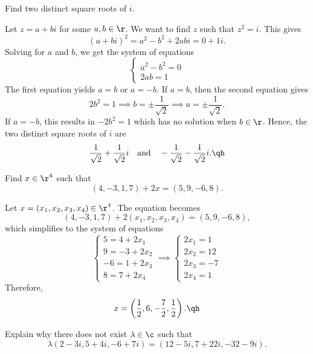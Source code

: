 \begin{exercise}[1a8]
    Find two distinct square roots of $i$.
\end{exercise}

\begin{sol}
    Let $z = a + bi$ for some $a, b \in \r$. We want to find $z$ such that $z^2 = i$. This gives
    \[(a + bi)^2 = a^2 - b^2 + 2abi = 0 + 1i.\]
    Solving for $a$ and $b$, we get the system of equations
    \[\begin{cases}
        a^2 - b^2 = 0 \\
        2ab = 1
    \end{cases}\]
    The first equation yields $a = b$ or $a = -b$. If $a = b$, then the second equation gives
    \[2b^2 = 1 \implies b = \pm\frac{1}{\sqrt{2}} \implies a = \pm\frac{1}{\sqrt{2}}.\]
    If $a = -b$, this results in $-2b^2 = 1$ which has no solution when $b \in \r$. Hence, the two distinct square roots of $i$ are
    \[\frac{1}{\sqrt{2}} + \frac{1}{\sqrt{2}}i \quad \text{and} \quad -\frac{1}{\sqrt{2}} - \frac{1}{\sqrt{2}}i. \qh\]
\end{sol}

\begin{exercise}[1a9]
    Find $x \in \r^4$ such that
    \[(4, -3, 1, 7) + 2x = (5, 9, -6, 8).\]
\end{exercise}

\begin{sol}
    Let $x = (x_1, x_2, x_3, x_4) \in \r^4$. The equation becomes
    \[(4, -3, 1, 7) + 2(x_1, x_2, x_3, x_4) = (5, 9, -6, 8),\]
    which simplifies to the system of equations
    \[\begin{cases}
        5 = 4 + 2x_1 \\
        9 = -3 + 2x_2 \\
        -6 = 1 + 2x_3 \\
        8 = 7 + 2x_4
    \end{cases} \implies 
    \begin{cases}
        2x_1 = 1 \\
        2x_2 = 12 \\
        2x_3 = -7 \\
        2x_4 = 1 
    \end{cases}\]
    Therefore,
    \[x = \left(\frac{1}{2}, 6, -\frac{7}{2}, \frac{1}{2}\right). \qh\]
\end{sol}

\begin{exercise}[1a10]
    Explain why there does not exist $\lambda \in \c$ such that
    \[\lambda(2 - 3i, 5 + 4i, -6 + 7i) = (12 - 5i, 7 + 22i, -32 - 9i).\]
\end{exercise}

